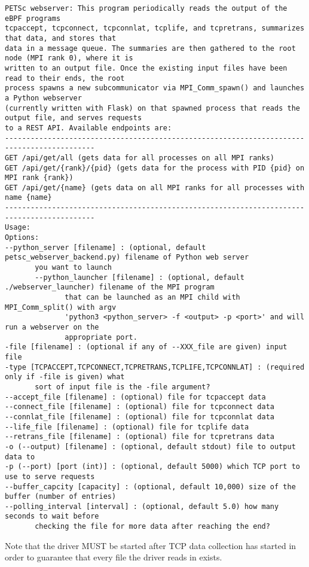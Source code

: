 \documentclass[11pt]{article}
\begin{document}
\begin{Verbatim}[xleftmargin=-3cm]
PETSc webserver: This program periodically reads the output of the eBPF programs
tcpaccept, tcpconnect, tcpconnlat, tcplife, and tcpretrans, summarizes that data, and stores that
data in a message queue. The summaries are then gathered to the root node (MPI rank 0), where it is
written to an output file. Once the existing input files have been read to their ends, the root
process spawns a new subcommunicator via MPI_Comm_spawn() and launches a Python webserver
(currently written with Flask) on that spawned process that reads the output file, and serves requests
to a REST API. Available endpoints are:
-------------------------------------------------------------------------------------------
GET /api/get/all (gets data for all processes on all MPI ranks)
GET /api/get/{rank}/{pid} (gets data for the process with PID {pid} on MPI rank {rank})
GET /api/get/{name} (gets data on all MPI ranks for all processes with name {name}
-------------------------------------------------------------------------------------------
Usage:
Options:
--python_server [filename] : (optional, default petsc_webserver_backend.py) filename of Python web server
       you want to launch
       --python_launcher [filename] : (optional, default ./webserver_launcher) filename of the MPI program
              that can be launched as an MPI child with MPI_Comm_split() with argv
              'python3 <python_server> -f <output> -p <port>' and will run a webserver on the
              appropriate port.
-file [filename] : (optional if any of --XXX_file are given) input file
-type [TCPACCEPT,TCPCONNECT,TCPRETRANS,TCPLIFE,TCPCONNLAT] : (required only if -file is given) what
       sort of input file is the -file argument?
--accept_file [filename] : (optional) file for tcpaccept data
--connect_file [filename] : (optional) file for tcpconnect data
--connlat_file [filename] : (optional) file for tcpconnlat data
--life_file [filename] : (optional) file for tcplife data
--retrans_file [filename] : (optional) file for tcpretrans data
-o (--output) [filename] : (optional, default stdout) file to output data to
-p (--port) [port (int)] : (optional, default 5000) which TCP port to use to serve requests
--buffer_capcity [capacity] : (optional, default 10,000) size of the buffer (number of entries)
--polling_interval [interval] : (optional, default 5.0) how many seconds to wait before
       checking the file for more data after reaching the end?
\end{Verbatim}
Note that the driver MUST be started after TCP data collection has started in order to guarantee that every file the driver reads in exists.
\end{document}
